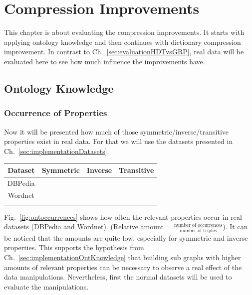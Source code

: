\section{Compression Improvements}

This chapter is about evaluating the compression improvements. It starts with applying ontology knowledge and then continues with dictionary compression improvement. In contrast to Ch.~\ref{sec:evaluationHDTvsGRP}, real data will be evaluated here to see how much influence the improvements have.

\subsection{Ontology Knowledge}\label{sec:evaluationOntKnowledge}

\subsubsection{Occurrence of Properties}
Now it will be presented how much of those symmetric/inverse/transitive properties exist in real data. For that we will use the datasets presented in Ch.~\ref{sec:implementationDatasets}. 

\begin{center}
\begin{tabular}{|c|c|c|c|}
	\hline 
	Dataset & Symmetric & Inverse & Transitive \\ 
	\hline 
	DBPedia &  &  &  \\ 
	\hline 
	Wordnet &  &  &  \\ 
	\hline 
	&  &  &  \\ 
	\hline 
\end{tabular}
\label{tab:properties}
\end{center}

Fig.~\ref{fig:ontoccurrences} shows how often the relevant properties occur in real datasets (DBPedia and Wordnet). (Relative amount = $\frac{\text{number of occurrences}}{\text{number of triples}}$). It can be noticed that the amounts are quite low, especially for symmetric and inverse properties. This supports the hypothesis from Ch.~\ref{sec:implementationOntKnowledge} that building sub graphs with higher amounts of relevant properties can be necessary to observe a real effect of the data manipulations. Nevertheless, first the normal datasets will be used to evaluate the manipulations.

